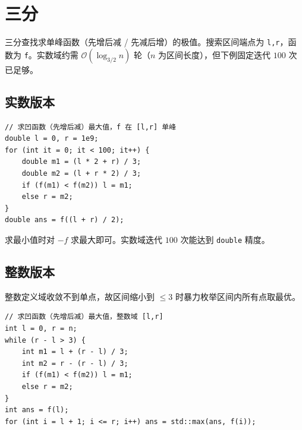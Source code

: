 \section{三分}

三分查找求单峰函数（先增后减 / 先减后增）的极值。搜索区间端点为 \texttt{l,r}，函数为 \texttt{f}。实数域约需 $\mathcal{O}(\log_{3/2}n)$ 轮（$n$ 为区间长度），但下例固定迭代 $100$ 次已足够。

\subsection{实数版本}

\begin{lstlisting}
// 求凹函数（先增后减）最大值，f 在 [l,r] 单峰
double l = 0, r = 1e9;
for (int it = 0; it < 100; it++) {
    double m1 = (l * 2 + r) / 3;
    double m2 = (l + r * 2) / 3;
    if (f(m1) < f(m2)) l = m1;
    else r = m2;
}
double ans = f((l + r) / 2);
\end{lstlisting}

求最小值时对 $-f$ 求最大即可。实数域迭代 $100$ 次能达到 \texttt{double} 精度。

\subsection{整数版本}

整数定义域收敛不到单点，故区间缩小到 $\le 3$ 时暴力枚举区间内所有点取最优。

\begin{lstlisting}
// 求凹函数（先增后减）最大值，整数域 [l,r]
int l = 0, r = n;
while (r - l > 3) {
    int m1 = l + (r - l) / 3;
    int m2 = r - (r - l) / 3;
    if (f(m1) < f(m2)) l = m1;
    else r = m2;
}
int ans = f(l);
for (int i = l + 1; i <= r; i++) ans = std::max(ans, f(i));
\end{lstlisting}
